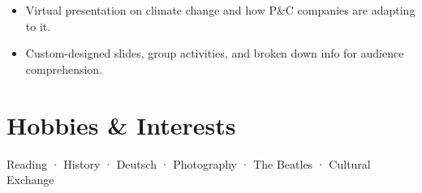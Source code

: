 \documentclass[12pt]{article}
\newcommand{\itemspace}{\vspace{0.1870em}}
\begin{document}
\begin{itemize}[noitemsep,nolistsep]
  \item Virtual presentation on climate change and how P\&C companies are
    adapting to it.


  \item Custom-designed slides, group activities, and broken down info for
    audience comprehension.
\end{itemize}

\itemspace

\section{Hobbies \& Interests}

Reading · History · Deutsch · Photography · The Beatles · Cultural Exchange
\end{document}

